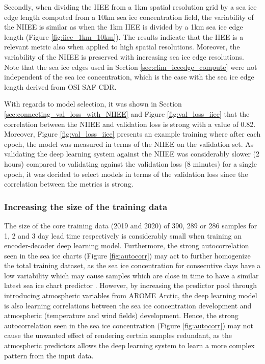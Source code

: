\documentclass[../main/thesis]{subfiles}
\begin{document}
Secondly, when dividing the IIEE from a 1km spatial resolution grid by a sea ice edge length computed from a 10km sea ice concentration field, the variability of the NIIEE is similar as when the 1km IIEE is divided by a 1km sea ice edge length (Figure \ref{fig:iiee_1km_10km}). The results indicate that the IIEE is a relevant metric also when applied to high spatial resolutions. Moreover, the variability of the NIIEE is preserved with increasing sea ice edge resolutions. Note that the sea ice edges used in Section \ref{sec:clim_iceedge_compute} were not independent of the sea ice concentration, which is the case with the sea ice edge length derived from OSI SAF CDR.

With regards to model selection, it was shown in Section \ref{sec:connecting_val_loss_with_NIIEE} and Figure \ref{fig:val_loss_iiee} that the correlation between the NIIEE and validation loss is strong with a value of 0.82. Moreover, Figure \ref{fig:val_loss_iiee} presents an example training where after each epoch, the model was measured in terms of the NIIEE on the validation set. As validating the deep learning system against the NIIEE was considerably slower (2 hours) compared to validating against the validation loss (8 minutes) for a single epoch, it was decided to select models in terms of the validation loss since the correlation between the metrics is strong.

\subsubsection{Increasing the size of the training data}
\label{sec:increase_data}
The size of the core training data (2019 and 2020) of 390, 289 or 286 samples for 1, 2 and 3 day lead time respectively is considerably small when training an encoder-decoder deep learning model. Furthermore, the strong autocorrelation seen in the sea ice charts (Figure \ref{fig:autocorr}) may act to further homogenize the total training dataset, as the sea ice concentration for consecutive days have a low variability which may cause samples which are close in time to have a similar latest sea ice chart predictor \citep{Fritzner2020}. However, by increasing the predictor pool through introducing atmospheric variables from AROME Arctic, the deep learning model is also learning correlations between the sea ice concentration development and atmospheric (temperature and wind fields) development. Hence, the strong autocorrelation seen in the sea ice concentration (Figure \ref{fig:autocorr}) may not cause the unwanted effect of rendering certain samples redundant, as the atmospheric predictors allows the deep learning system to learn a more complex pattern from the input data.
\end{document}
